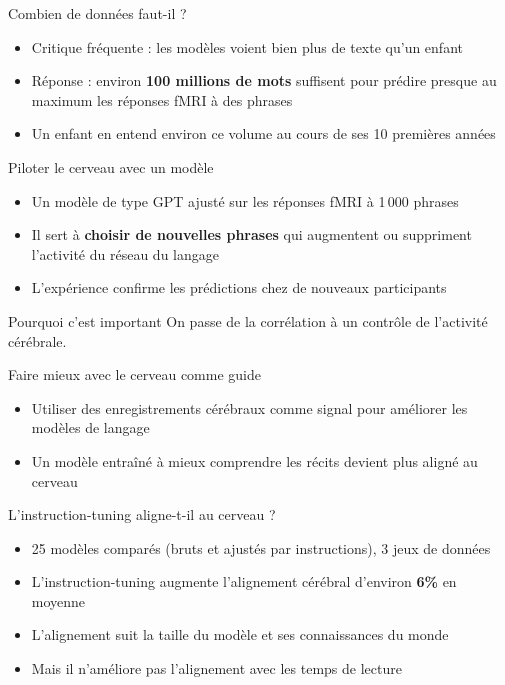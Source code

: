 \begin{frame}{Combien de données faut-il ?}
\begin{itemize}
    \item Critique fréquente : les modèles voient bien plus de texte qu'un enfant
    \item Réponse : environ \textbf{100 millions de mots} suffisent pour prédire presque au maximum les réponses fMRI à des phrases
    \item Un enfant en entend environ ce volume au cours de ses 10 premières années
\end{itemize}
\end{frame}

\begin{frame}{Piloter le cerveau avec un modèle}
\begin{itemize}
    \item Un modèle de type GPT ajusté sur les réponses fMRI à 1\,000 phrases
    \item Il sert à \textbf{choisir de nouvelles phrases} qui augmentent ou suppriment l'activité du réseau du langage
    \item L'expérience confirme les prédictions chez de nouveaux participants
\end{itemize}
\vspace{0.5em}
\begin{block}{Pourquoi c'est important}
    On passe de la corrélation à un contrôle de l'activité cérébrale.
\end{block}
\end{frame}

\begin{frame}{Faire mieux avec le cerveau comme guide}
\begin{itemize}
    \item Utiliser des enregistrements cérébraux comme signal pour améliorer les modèles de langage
    \item Un modèle entraîné à mieux comprendre les récits devient plus aligné au cerveau
\end{itemize}
\end{frame}

\begin{frame}{L'instruction-tuning aligne-t-il au cerveau ?}
\begin{itemize}
    \item 25 modèles comparés (bruts et ajustés par instructions), 3 jeux de données
    \item L'instruction-tuning augmente l'alignement cérébral d'environ \textbf{6\%} en moyenne
    \item L'alignement suit la taille du modèle et ses connaissances du monde
    \item Mais il n'améliore pas l'alignement avec les temps de lecture
\end{itemize}
\end{frame}

